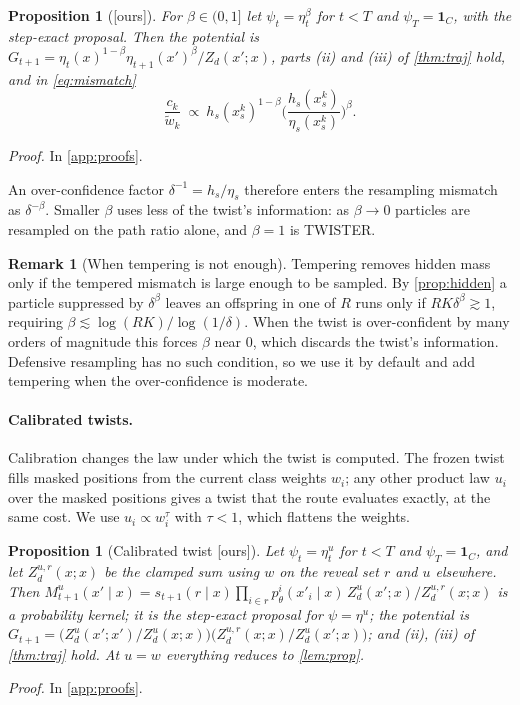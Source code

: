 \documentclass[11pt]{article}
\newtheorem{proposition}[theorem]{Proposition}
\theoremstyle{definition}
\newtheorem{remark}[theorem]{Remark}
\newcommand{\one}{\mathbf{1}}
\newcommand{\wt}{\tilde w}
\newcommand{\status}[1]{\textsf{\small[#1]}}
\newcommand{\proofref}[1]{\par\noindent\textit{Proof.} #1\par\smallskip}
\begin{document}
\begin{proposition}[\status{ours}]\label{prop:tempered}
For $\beta\in(0,1]$ let $\psi_t=\eta_t^\beta$ for $t<T$ and $\psi_T=\one_C$, with the step-exact proposal. Then
the potential is $G_{t+1}=\eta_t(x)^{1-\beta}\eta_{t+1}(x')^\beta/Z_d(x';x)$, parts (ii) and (iii) of
\cref{thm:traj} hold, and in \eqref{eq:mismatch}
\[
  \frac{c_k}{\wt_k}\ \propto\ h_s(x^k_s)^{1-\beta}\Big(\frac{h_s(x^k_s)}{\eta_s(x^k_s)}\Big)^{\beta}.
\]
\end{proposition}
\proofref{In \cref{app:proofs}.}

An over-confidence factor $\delta^{-1}=h_s/\eta_s$ therefore enters the resampling mismatch as $\delta^{-\beta}$.
Smaller $\beta$ uses less of the twist's information: as $\beta\to0$ particles are resampled on the path ratio
alone, and $\beta=1$ is TWISTER.

\begin{remark}[When tempering is not enough]
Tempering removes hidden mass only if the tempered mismatch is large enough to be sampled. By
\cref{prop:hidden} a particle suppressed by $\delta^\beta$ leaves an offspring in one of $R$ runs only if
$RK\delta^\beta\gtrsim1$, requiring $\beta\lesssim\log(RK)/\log(1/\delta)$. When the twist is over-confident by
many orders of magnitude this forces $\beta$ near 0, which discards the twist's information. Defensive resampling
has no such condition, so we use it by default and add tempering when the over-confidence is moderate.
\end{remark}

\paragraph{Calibrated twists.}
Calibration changes the law under which the twist is computed. The frozen twist fills masked positions from the
current class weights $w_i$; any other product law $u_i$ over the masked positions gives a twist that the route
evaluates exactly, at the same cost. We use $u_i\propto w_i^\tau$ with $\tau<1$, which flattens the weights.

\begin{proposition}[Calibrated twist \status{ours}]\label{prop:calibrated}
Let $\psi_t=\eta^u_t$ for $t<T$ and $\psi_T=\one_C$, and let $Z^{u,r}_d(x;x)$ be the clamped sum using $w$ on the
reveal set $r$ and $u$ elsewhere. Then
$M^u_{t+1}(x'\mid x)=s_{t+1}(r\mid x)\prod_{i\in r}p^i_\theta(x'_i\mid x)\,Z^u_d(x';x)/Z^{u,r}_d(x;x)$
is a probability kernel; it is the step-exact proposal for $\psi=\eta^u$; the potential is
$G_{t+1}=\big(Z^u_d(x';x')/Z^u_d(x;x)\big)\big(Z^{u,r}_d(x;x)/Z^u_d(x';x)\big)$; and (ii), (iii) of
\cref{thm:traj} hold. At $u=w$ everything reduces to \cref{lem:prop}.
\end{proposition}
\proofref{In \cref{app:proofs}.}
\end{document}
